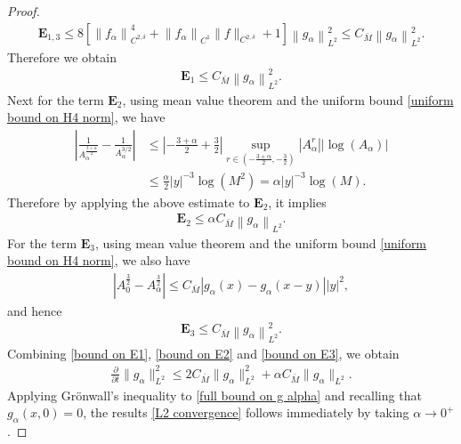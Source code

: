 \documentclass[10pt,a4paper]{amsart}
\begin{document}
\begin{proof}
\begin{align*}
\mathbf{E}_{1,3}\le 8\left[\left\|f_{\alpha}\right\|_{C^{2, \delta}}^{4}+\left\|f_{\alpha}\right\|_{C^{1}}\|f\|_{C^{2, \delta}}+1\right]\left\|g_{\alpha}\right\|_{L^{2}}^{2}\le C_{\bar{M}}\left\|g_{\alpha}\right\|_{L^{2}}^{2}.
\end{align*} 
Therefore we obtain
\begin{align}\label{bound on E1}
\mathbf{E}_{1}\le C_{\bar{M}}\left\|g_{\alpha}\right\|_{L^{2}}^{2}.
\end{align}
Next for the term $\mathbf{E}_2$, using mean value theorem and the uniform bound \eqref{uniform bound on H4 norm}, we have
\begin{align*}
\left|\frac{1}{A_{\alpha}^{\frac{3+\alpha}{2}}}-\frac{1}{A_{\alpha}^{3 / 2}}\right|&\le\left|-\frac{3+\alpha}{2}+\frac{3}{2}\right|\sup_{r\in(-\frac{3+\alpha}{2},-\frac{3}{2})}|A_{\alpha}^r||\log(A_\alpha)|\\
&\le\frac{\alpha}{2}|y|^{-3}\log(M^2)=\alpha|y|^{-3}\log(M).
\end{align*}
Therefore by applying the above estimate to $\mathbf{E}_2$, it implies
\begin{align}\label{bound on E2}
\mathbf{E}_2\le \alpha C_{\bar{M}}\left\|g_{\alpha}\right\|_{L^{2}}.
\end{align}
For the term $\mathbf{E}_3$, using mean value theorem and the uniform bound \eqref{uniform bound on H4 norm}, we also have
\begin{align*}
|A_{0}^\frac{3}{2}-A_{\alpha}^\frac{3}{2}|\le C_{\bar{M}}|g_{\alpha}(x)-g_{\alpha}(x-y)||y|^2,
\end{align*}
and hence
\begin{align}\label{bound on E3}
\mathbf{E}_3\le C_{\bar{M}}\left\|g_{\alpha}\right\|_{L^{2}}^{2}.
\end{align}
Combining \eqref{bound on E1}, \eqref{bound on E2} and \eqref{bound on E3}, we obtain
\begin{align}\label{full bound on g alpha}
\frac{\partial}{\partial t}\|g_{\alpha}\|^2_{L^2}\le 2C_{\bar{M}}\|g_{\alpha}\|^2_{L^2}+\alpha C_{\bar{M}}\|g_{\alpha}\|_{L^2}.
\end{align}
Applying Gr\"{o}nwall's inequality to \eqref{full bound on g alpha} and recalling that $g_{\alpha}(x,0)=0$, the results \eqref{L2 convergence} follows immediately by taking $\alpha\to0^{+}$.
\end{proof}
\end{document}
